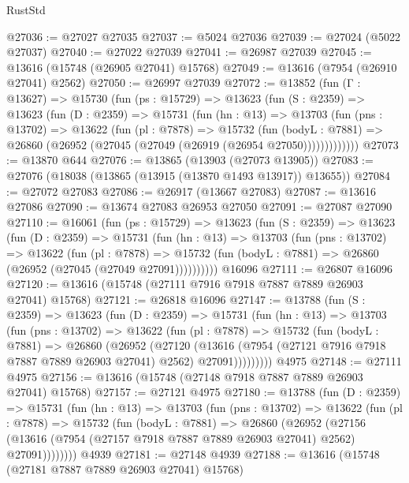 \begin{lexlean}{RustStd}
\begin{coremodule}
@27036 := @27027 @27035
@27037 := @5024 @27036
@27039 := @27024 (@5022 @27037)
@27040 := @27022 @27039
@27041 := @26987 @27039
@27045 := @13616 (@15748 (@26905 @27041) @15768)
@27049 := @13616 (@7954 (@26910 @27041) @2562)
@27050 := @26997 @27039
@27072 := @13852
    (fun (Γ : @13627) =>
    @15730
      (fun (ps : @15729) =>
      @13623
        (fun (S : @2359) =>
        @13623
          (fun (D : @2359) =>
          @15731
            (fun (hn : @13) =>
            @13703
              (fun (pns : @13702) =>
              @13622
                (fun (pl : @7878) =>
                @15732
                  (fun (bodyL : @7881) =>
                  @26860 (@26952 (@27045 (@27049 (@26919 (@26954 @27050)))))))))))))
@27073 := @13870 @644
@27076 := @13865 (@13903 (@27073 @13905))
@27083 := @27076 (@18038 (@13865 (@13915 (@13870 @1493 @13917)) @13655))
@27084 := @27072 @27083
@27086 := @26917 (@13667 @27083)
@27087 := @13616 @27086
@27090 := @13674 @27083 @26953 @27050
@27091 := @27087 @27090
@27110 := @16061
    (fun (ps : @15729) =>
    @13623
      (fun (S : @2359) =>
      @13623
        (fun (D : @2359) =>
        @15731
          (fun (hn : @13) =>
          @13703
            (fun (pns : @13702) =>
            @13622
              (fun (pl : @7878) =>
              @15732 (fun (bodyL : @7881) => @26860 (@26952 (@27045 (@27049 @27091))))))))))
    @16096
@27111 := @26807 @16096
@27120 := @13616 (@15748 (@27111 @7916 @7918 @7887 @7889 @26903 @27041) @15768)
@27121 := @26818 @16096
@27147 := @13788
    (fun (S : @2359) =>
    @13623
      (fun (D : @2359) =>
      @15731
        (fun (hn : @13) =>
        @13703
          (fun (pns : @13702) =>
          @13622
            (fun (pl : @7878) =>
            @15732
              (fun (bodyL : @7881) =>
              @26860
                (@26952
                  (@27120
                    (@13616
                      (@7954 (@27121 @7916 @7918 @7887 @7889 @26903 @27041) @2562)
                      @27091)))))))))
    @4975
@27148 := @27111 @4975
@27156 := @13616 (@15748 (@27148 @7918 @7887 @7889 @26903 @27041) @15768)
@27157 := @27121 @4975
@27180 := @13788
    (fun (D : @2359) =>
    @15731
      (fun (hn : @13) =>
      @13703
        (fun (pns : @13702) =>
        @13622
          (fun (pl : @7878) =>
          @15732
            (fun (bodyL : @7881) =>
            @26860
              (@26952
                (@27156
                  (@13616 (@7954 (@27157 @7918 @7887 @7889 @26903 @27041) @2562) @27091))))))))
    @4939
@27181 := @27148 @4939
@27188 := @13616 (@15748 (@27181 @7887 @7889 @26903 @27041) @15768)

\end{coremodule}
\end{lexlean}
